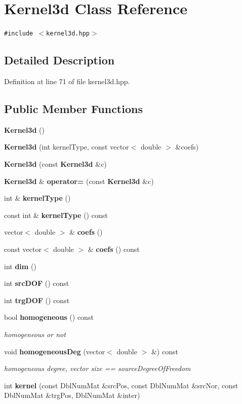 \section{Kernel3d Class Reference}
\label{classKernel3d}
{\tt \#include $<$kernel3d.hpp$>$}



\subsection{Detailed Description}




Definition at line 71 of file kernel3d.hpp.\subsection*{Public Member Functions}
\begin{CompactItemize}
\item 
{\bf Kernel3d} ()
\item 
{\bf Kernel3d} (int kernel\-Type, const vector$<$ double $>$ \&coefs)
\item 
{\bf Kernel3d} (const {\bf Kernel3d} \&c)
\item 
{\bf Kernel3d} \& {\bf operator=} (const {\bf Kernel3d} \&c)
\item 
int \& {\bf kernel\-Type} ()
\item 
const int \& {\bf kernel\-Type} () const 
\item 
vector$<$ double $>$ \& {\bf coefs} ()
\item 
const vector$<$ double $>$ \& {\bf coefs} () const 
\item 
int {\bf dim} ()
\item 
int {\bf src\-DOF} () const 
\item 
int {\bf trg\-DOF} () const 
\item 
bool {\bf homogeneous} () const 
\begin{CompactList}\small\item\em homogeneous or not \item\end{CompactList}\item 
void {\bf homogeneous\-Deg} (vector$<$ double $>$ \&) const 
\begin{CompactList}\small\item\em homogeneous degree, vector size == source\-Degree\-Of\-Freedom \item\end{CompactList}\item 
int {\bf kernel} (const Dbl\-Num\-Mat \&src\-Pos, const Dbl\-Num\-Mat \&src\-Nor, const Dbl\-Num\-Mat \&trg\-Pos, Dbl\-Num\-Mat \&inter)
\end{CompactItemize}
